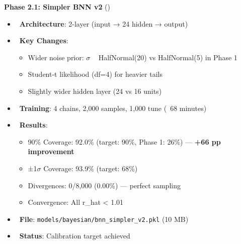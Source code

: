 \textbf{Phase 2.1: Simpler BNN v2} (\done)
\begin{itemize}
  \item \done\ \textbf{Architecture}: 2-layer (input → 24 hidden → output)
  \item \done\ \textbf{Key Changes}:
  \begin{itemize}
    \item Wider noise prior: $\sigma$ ~ HalfNormal(20) vs HalfNormal(5) in Phase 1
    \item Student-t likelihood (df=4) for heavier tails
    \item Slightly wider hidden layer (24 vs 16 units)
  \end{itemize}
  \item \done\ \textbf{Training}: 4 chains, 2,000 samples, 1,000 tune (~68 minutes)
  \item \done\ \textbf{Results}:
  \begin{itemize}
    \item 90\% Coverage: 92.0\% (target: 90\%, Phase 1: 26\%) — \textbf{+66 pp improvement}
    \item ±1$\sigma$ Coverage: 93.9\% (target: 68\%)
    \item Divergences: 0/8,000 (0.00\%) — perfect sampling
    \item Convergence: All r\_hat < 1.01
  \end{itemize}
  \item \done\ \textbf{File}: \texttt{models/bayesian/bnn\_simpler\_v2.pkl} (10 MB)
  \item \done\ \textbf{Status}: \checkmark Calibration target achieved
\end{itemize}

